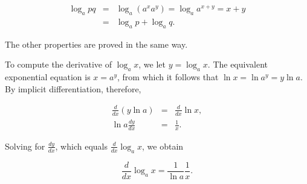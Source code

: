 \begin{eqnarray*}
\log_{a}pq &=& \log_{a}(a^{x} a^{y}) = \log_{a}a^{x + y} = x + y\\
          &=& \log_{a}p + \log_{a}q.
\end{eqnarray*}

\noindent The other properties are proved in the same way.

To compute the derivative of $\log_{a}x$, we let $y = \log_{a}x$. The equivalent exponential equation is $x = a^y$,  from which it follows that $\ln x = \ln a^y = y \ln a$. By implicit differentiation, therefore,

\begin{eqnarray*}
\frac{d}{dx}(y \ln a) &=& \frac{d}{dx} \ln x,\\
  \ln a \frac{dy}{dx} &=& \frac{1}{x}.
\end{eqnarray*}

\noindent Solving for $\frac{dy}{dx}$, which equals $\frac{d}{dx} \log_{a}x$, we obtain

\begin{theorem} %
$$
\frac{d}{dx} \log_{a}x = \frac{1}{\ln a} \frac{1}{x}.
$$
\end{theorem}
